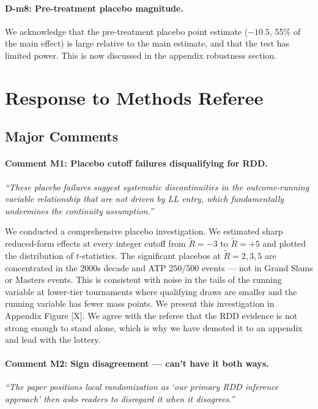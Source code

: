 \documentclass[12pt]{article}
\newcommand{\resp}[1]{\textcolor{response}{#1}}
\begin{document}
\paragraph{D-m8: Pre-treatment placebo magnitude.}
\resp{We acknowledge that the pre-treatment placebo point estimate ($-10.5$, 55\% of the main effect) is large relative to the main estimate, and that the test has limited power. This is now discussed in the appendix robustness section.}

\newpage

\section*{Response to Methods Referee}

\subsection*{Major Comments}

\paragraph{Comment M1: Placebo cutoff failures disqualifying for RDD.}
\textit{``These placebo failures suggest systematic discontinuities in the outcome-running variable relationship that are not driven by LL entry, which fundamentally undermines the continuity assumption.''}

\resp{We conducted a comprehensive placebo investigation. We estimated sharp reduced-form effects at every integer cutoff from $\tilde{R} = -3$ to $\tilde{R} = +5$ and plotted the distribution of $t$-statistics. The significant placebos at $\tilde{R} = 2, 3, 5$ are concentrated in the 2000s decade and ATP 250/500 events --- not in Grand Slams or Masters events. This is consistent with noise in the tails of the running variable at lower-tier tournaments where qualifying draws are smaller and the running variable has fewer mass points. We present this investigation in Appendix Figure [X]. We agree with the referee that the RDD evidence is not strong enough to stand alone, which is why we have demoted it to an appendix and lead with the lottery.}

\paragraph{Comment M2: Sign disagreement --- can't have it both ways.}
\textit{``The paper positions local randomization as `our primary RDD inference approach' then asks readers to disregard it when it disagrees.''}
\end{document}
